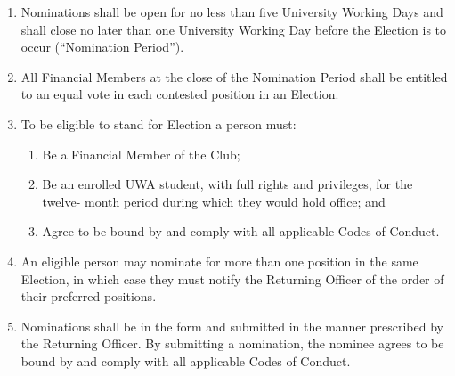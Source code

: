 \documentclass[12pt]{article}
\begin{document}
\begin{enumerate}[label=7.\arabic*]
\item Nominations shall be open for no less than five University Working Days and shall
close no later than one University Working Day before the Election is to occur
(``Nomination Period'').

\item All Financial Members at the close of the Nomination Period shall be entitled to an
equal vote in each contested position in an Election.

\item To be eligible to stand for Election a person must:
  \begin{enumerate}[label=7.7.\arabic*]
    \item Be a Financial Member of the Club;
    \item Be an enrolled UWA student, with full rights and privileges, for the twelve-
month period during which they would hold office; and
    \item Agree to be bound by and comply with all applicable Codes of Conduct.
  \end{enumerate}

\item An eligible person may nominate for more than one position in the same Election,
in which case they must notify the Returning Officer of the order of their preferred
positions.

\item Nominations shall be in the form and submitted in the manner prescribed by the
Returning Officer. By submitting a nomination, the nominee agrees to be bound by
and comply with all applicable Codes of Conduct.


\end{enumerate}
\end{document}
